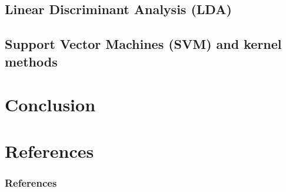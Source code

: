 \documentclass[xcolor=pdftex,dvipsnames,table]{beamer}
\begin{document}
\subsection{Linear Discriminant Analysis (LDA)}
\subsection{Support Vector Machines (SVM) and kernel methods}

\section{Conclusion}


\section{References}
\begin{frame}[allowframebreaks]
	\frametitle{References}
	
\end{frame}
\end{document}
